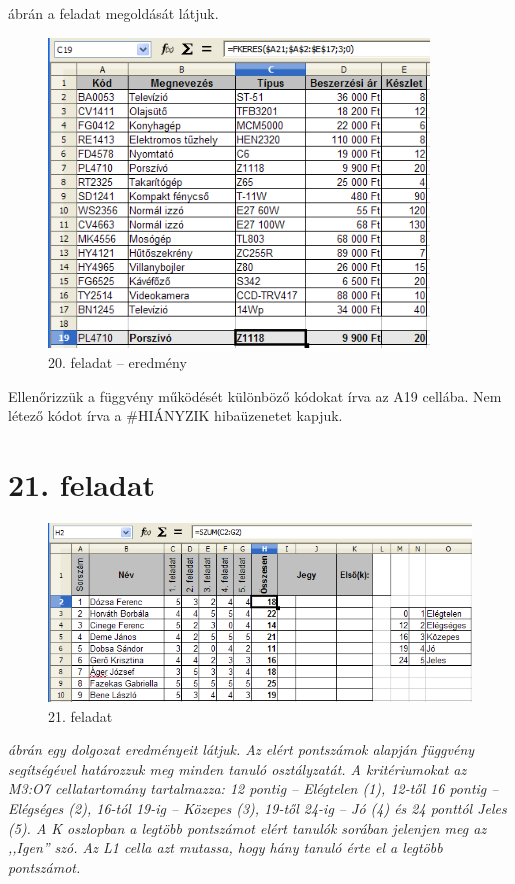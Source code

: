  ábrán a feladat megoldását látjuk.

\begin{figure}[!h]
\begin{center}
\includegraphics[width=10.104cm]{oocalcv2-img96.png}
\caption{20. feladat -- eredmény}\label{20-feladatEredmény}
\end{center}
\end{figure}

Ellenőrizzük a függvény működését
különböző kódokat írva az A19 cellába. Nem létező
kódot írva a \#HIÁNYZIK hibaüzenetet kapjuk.


\section{21. feladat}

\begin{figure}[!h]
\begin{center}
\includegraphics[width=13.999cm]{oocalcv2-img97.png}
\caption{21. feladat}\label{21-feladat}
\end{center}
\end{figure}

{\itshape
{} ábrán egy dolgozat eredményeit látjuk. Az elért
pontszámok alapján függvény segítségével határozzuk meg
minden tanuló osztályzatát. A kritériumokat az M3:O7
cellatartomány tartalmazza: 12 pontig -- Elégtelen (1), 12-től
16 pontig -- Elégséges (2), 16-tól 19-ig -- Közepes (3),
 19-től 24-ig -- Jó (4) és 24 ponttól Jeles (5). A K oszlopban a
legtöbb pontszámot elért tanulók sorában jelenjen meg az
,,Igen'' szó. Az L1 cella azt mutassa,
hogy hány tanuló érte el a legtöbb pontszámot.}

